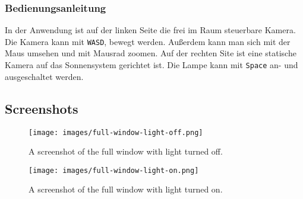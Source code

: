 \documentclass{article}
\let\oldsubsection\subsection
\renewcommand\subsection{\needspace{10\baselineskip}\oldsubsection}
\let\oldsubsubsection\subsubsection
\renewcommand\subsubsection{\needspace{7\baselineskip}\oldsubsubsection}
\begin{document}
\vspace{1em}

\subsubsection*{Bedienungsanleitung}
In der Anwendung ist auf der linken Seite die frei im Raum steuerbare Kamera.
Die Kamera kann mit \texttt{WASD}, bewegt werden.
Außerdem kann man sich mit der Maus umsehen und mit Mausrad zoomen.
Auf der rechten Site ist eine statische Kamera auf das Sonnensystem gerichtet ist.
Die Lampe kann mit \texttt{Space} an- und ausgeschaltet werden.

\clearpage

\subsection{Screenshots}

\begin{figure}[h]
    \centering
    \texttt{[image: images/full-window-light-off.png]}
    \caption{A screenshot of the full window with light turned off.}
    \label{fig:full-window}
\end{figure}

\begin{figure}[h]
    \centering
    \texttt{[image: images/full-window-light-on.png]}
    \caption{A screenshot of the full window with light turned on.}
    \label{fig:viewport}
\end{figure}
\end{document}
